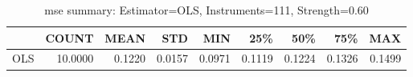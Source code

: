 \begin{table}[ht]
\centering
\caption{mse summary: Estimator=OLS, Instruments=111, Strength=0.60}
\begin{tabular}{lrrrrrrrr}
\toprule
 & COUNT & MEAN & STD & MIN & 25\% & 50\% & 75\% & MAX \\
\midrule
OLS & 10.0000 & 0.1220 & 0.0157 & 0.0971 & 0.1119 & 0.1224 & 0.1326 & 0.1499 \\
\bottomrule
\end{tabular}
\end{table}
